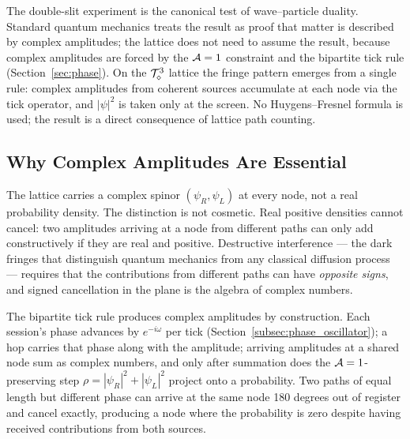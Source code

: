 
\label{sec:interference}

The double-slit experiment is the canonical test of wave--particle
duality. Standard quantum mechanics treats the result as proof that
matter is described by complex amplitudes; the lattice does not need
to assume the result, because complex amplitudes are forced by the
$\mathcal{A}=1$ constraint and the bipartite tick rule
(Section~\ref{sec:phase}). On the $\mathcal{T}_\diamond^3$ lattice the fringe
pattern emerges from a single rule: complex amplitudes from coherent
sources accumulate at each node via the tick operator, and
$|\psi|^2$ is taken only at the screen. No Huygens--Fresnel formula
is used; the result is a direct consequence of lattice path
counting.

\subsection{Why Complex Amplitudes Are Essential}
\label{subsec:why_complex}

The lattice carries a complex spinor $(\psi_R, \psi_L)$ at every
node, not a real probability density. The distinction is not
cosmetic. Real positive densities cannot cancel: two amplitudes
arriving at a node from different paths can only add constructively
if they are real and positive. Destructive interference --- the
dark fringes that distinguish quantum mechanics from any classical
diffusion process --- requires that the contributions from different
paths can have \emph{opposite signs}, and signed cancellation in the
plane is the algebra of complex numbers.

The bipartite tick rule produces complex amplitudes by construction.
Each session's phase advances by $e^{-i\omega}$ per tick
(Section~\ref{subsec:phase_oscillator}); a hop carries that phase
along with the amplitude; arriving amplitudes at a shared node sum
as complex numbers, and only after summation does the
$\mathcal{A}=1$-preserving step $\rho = |\psi_R|^2 + |\psi_L|^2$ project
onto a probability. Two paths of equal length but different phase can
arrive at the same node 180 degrees out of register and cancel
exactly, producing a node where the probability is zero despite
having received contributions from both sources.

